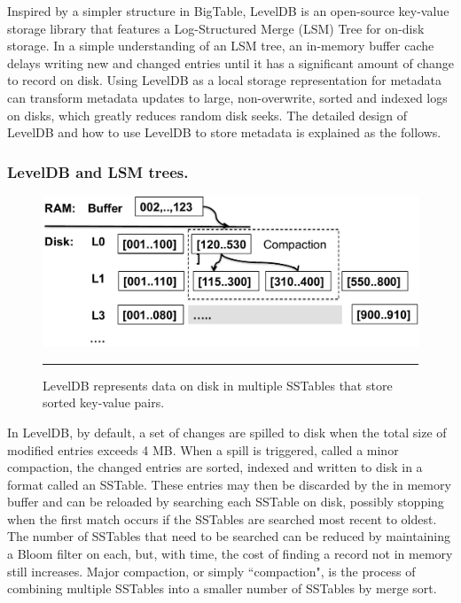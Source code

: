 Inspired by a simpler structure in BigTable\citep{BigTable}, 
LevelDB \citep{LevelDB} is an open-source key-value storage library
that features a Log-Structured Merge (LSM) Tree \citep{ONeil1996} for on-disk storage.
In a simple understanding of an LSM tree, an in-memory buffer cache delays 
writing new and changed entries until it has a significant amount of change to record on disk.
Using LevelDB as a local storage representation for metadata  
can transform metadata updates to large, non-overwrite, sorted and indexed logs on disks,
which greatly reduces random disk seeks.
The detailed design of LevelDB and how to use LevelDB to store metadata is explained as the follows.

\subsubsection*{LevelDB and LSM trees. }

\begin{figure}[t]
\centering
\includegraphics[scale=0.4]{figs/leveldb}
\caption{LevelDB represents data on disk in multiple SSTables that store sorted key-value pairs.}
\vspace{10pt}
\hrule 
\label{fig:leveldb}
\end{figure}


In LevelDB, by default, a set of changes are spilled to disk when the total
size of modified entries exceeds 4 MB.  When a spill is triggered, called a
minor compaction, the changed entries are sorted, indexed and written to disk
in a format called an SSTable\citep{BigTable}.  These entries may then be
discarded by the in memory buffer and can be reloaded by searching each SSTable
on disk, possibly stopping when the first match occurs if the SSTables are
searched most recent to oldest.  The number of SSTables that need to be
searched can be reduced by maintaining a Bloom filter\citep{bloomfilter} on
each, but, with time, the cost of finding a record not in memory still increases.  Major compaction, or simply ``compaction", is the process of combining multiple SSTables into a smaller number of SSTables by merge sort. 

